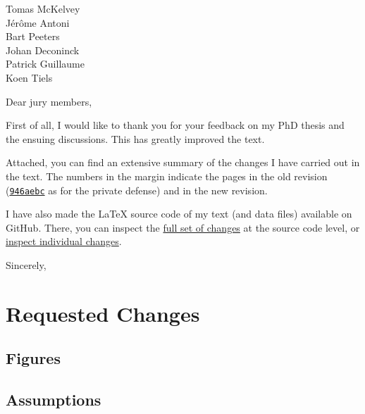 \documentclass{responseletter}
\date{\today}
\begin{document}
\begin{letter}{%
Tomas McKelvey\\
Jérôme Antoni\\
Bart Peeters\\
Johan Deconinck\\
Patrick Guillaume\\
Koen Tiels}

\opening{Dear jury members,}

First of all, I would like to thank you for your feedback on my PhD thesis and the ensuing discussions.
This has greatly improved the text.

Attached, you can find an extensive summary of the changes I have carried out in the text.
The numbers in the margin indicate the pages in the old revision (\href{https://github.com/egeerardyn/phdthesis/releases/tag/private-submit}{\texttt{946aebc}} as for the private defense) and in the new revision.

I have also made the \LaTeX{} source code of my text (and data files) available on GitHub.
There, you can inspect the \href{https://github.com/egeerardyn/phdthesis/compare/b6b273e...master}{full set of changes} at the source code level, or \href{https://github.com/egeerardyn/phdthesis/commits/master}{inspect individual changes}.

\closing{Sincerely,}
\end{letter}

\section{Requested Changes}

\subsection{Figures}

\subsection{Assumptions}
\end{document}
